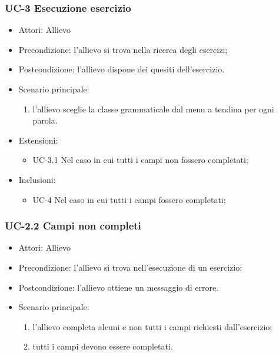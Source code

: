 	\subsubsection{UC-3 Esecuzione esercizio}
		\begin{itemize}
			\item Attori: Allievo
			\item Precondizione: l'allievo si trova nella ricerca degli esercizi;
			\item Postcondizione: l'allievo dispone dei quesiti dell'esercizio.
			\item Scenario principale:
				\begin{enumerate}
					\item l'allievo sceglie la classe grammaticale dal menu a tendina per ogni parola.
				\end{enumerate}
			\item Estensioni: 
				\begin{itemize}
					\item UC-3.1 Nel caso in cui tutti i campi non fossero completati;
				\end{itemize}
			\item Inclusioni:
				\begin{itemize}
					\item UC-4 Nel caso in cui tutti i campi fossero completati;
				\end{itemize}
			\end{itemize}
	\subsubsection{UC-2.2 Campi non completi}
		\begin{itemize}
			\item Attori: Allievo
			\item Precondizione: l'allievo si trova nell'esecuzione di un esercizio;
			\item Postcondizione: l'allievo ottiene un messaggio di errore.
			\item Scenario principale:
				\begin{enumerate}
					\item l'allievo completa alcuni e non tutti i campi richiesti dall'esercizio;
					\item tutti i campi devono essere completati.
				\end{enumerate}
		\end{itemize}
